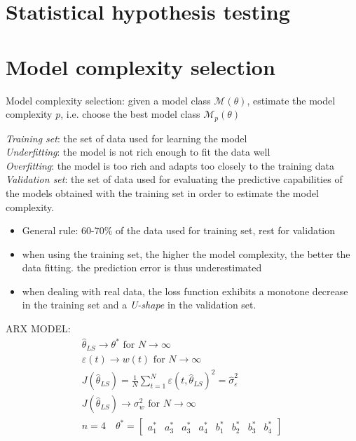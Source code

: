 \documentclass{book}
\theoremstyle{definition}
\theoremstyle{remark}
\theoremstyle{remark}
\begin{document}
\chapter{Statistical hypothesis testing}

\chapter{Model complexity selection}

Model complexity selection: given a model class $\mathcal{M}(\theta)$, estimate the model complexity $p$, i.e. choose the best model class $\mathcal{M}_p(\theta)$

\emph{Training set}: the set of data used for learning the model\\
\emph{Underfitting}: the model is not rich enough to fit the data well\\
\emph{Overfitting}: the model is too rich and adapts too closely to the training data\\
\emph{Validation set}: the set of data used for evaluating the predictive capabilities of the models obtained with the training set in order to estimate the model complexity.
\begin{itemize}
    \item General rule: 60-70\% of the data used for training set, rest for validation 
    \item when using the training set, the higher the model complexity, the better the data fitting. the prediction error is thus underestimated
    \item when dealing with real data, the loss function exhibits a monotone decrease in the training set and a \emph{U-shape} in the validation set.
\end{itemize}

ARX MODEL: 
\begin{gather*}
    \hat{\theta}_{LS} \to \theta^* \text{ for } N\to \infty\\
    \varepsilon(t) \to w(t) \text{ for } N\to\infty\\
    J(\hat{\theta}_{LS})=\displaystyle\frac{1}{N}\displaystyle\sum_{t=1}^{N}\varepsilon(t,\hat{\theta}_{LS})^2 = \hat{\sigma}_\varepsilon^2\\
    J(\hat{\theta}_{LS}) \to \sigma_w^2 \text{ for } N\to \infty\\
    n=4 \quad \theta^* = \begin{bmatrix}
        a_1^* & a_3^* & a_3^* & a_4^* & b_1^* &  b_2^* & b_3^* & b_4^*
    \end{bmatrix}
\end{gather*}
\end{document}
